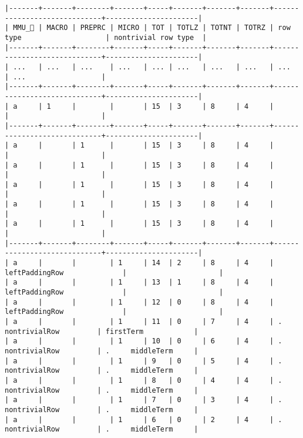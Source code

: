 \documentclass[varwidth=\maxdimen,margin=0.5cm,multi={verbatim}]{standalone}
\begin{document}
\begin{verbatim}
|-------+-------+--------+-------+-----+-------+-------+-------+-----------------------------+----------------------|
| MMU_ | MACRO | PREPRC | MICRO | TOT | TOTLZ | TOTNT | TOTRZ | row type                    | nontrivial row type  |
|-------+-------+--------+-------+-----+-------+-------+-------+-----------------------------+----------------------|
| ...   | ...   | ...    | ...   | ... | ...   | ...   | ...   | ...                         | ...                  |
|-------+-------+--------+-------+-----+-------+-------+-------+-----------------------------+----------------------|
| a     | 1     |        |       | 15  | 3     | 8     | 4     |                             |                      |
|-------+-------+--------+-------+-----+-------+-------+-------+-----------------------------+----------------------|
| a     |       | 1      |       | 15  | 3     | 8     | 4     |                             |                      |
| a     |       | 1      |       | 15  | 3     | 8     | 4     |                             |                      |
| a     |       | 1      |       | 15  | 3     | 8     | 4     |                             |                      |
| a     |       | 1      |       | 15  | 3     | 8     | 4     |                             |                      |
| a     |       | 1      |       | 15  | 3     | 8     | 4     |                             |                      |
|-------+-------+--------+-------+-----+-------+-------+-------+-----------------------------+----------------------|
| a     |       |        | 1     | 14  | 2     | 8     | 4     | leftPaddingRow              |                      |
| a     |       |        | 1     | 13  | 1     | 8     | 4     | leftPaddingRow              |                      |
| a     |       |        | 1     | 12  | 0     | 8     | 4     | leftPaddingRow              |                      |
| a     |       |        | 1     | 11  | 0     | 7     | 4     | .     nontrivialRow         | firstTerm            |
| a     |       |        | 1     | 10  | 0     | 6     | 4     | .     nontrivialRow         | .     middleTerm     |
| a     |       |        | 1     | 9   | 0     | 5     | 4     | .     nontrivialRow         | .     middleTerm     |
| a     |       |        | 1     | 8   | 0     | 4     | 4     | .     nontrivialRow         | .     middleTerm     |
| a     |       |        | 1     | 7   | 0     | 3     | 4     | .     nontrivialRow         | .     middleTerm     |
| a     |       |        | 1     | 6   | 0     | 2     | 4     | .     nontrivialRow         | .     middleTerm     |

\end{verbatim}
\end{document}
